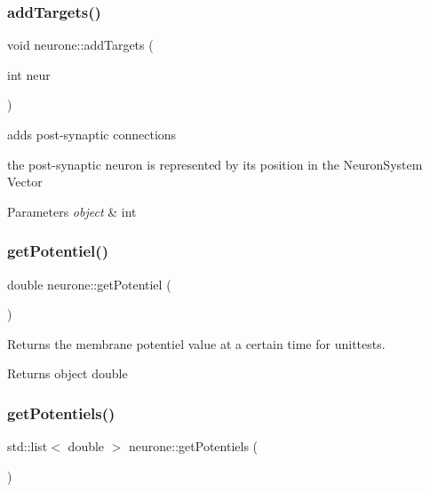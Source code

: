 \subsubsection{\texorpdfstring{add\+Targets()}{addTargets()}}
{\footnotesize\ttfamily void neurone\+::add\+Targets (\begin{DoxyParamCaption}\item[{int}]{neur }\end{DoxyParamCaption})}



add\textquotesingle{}s post-\/synaptic connections 

the post-\/synaptic neuron is represented by its position in the Neuron\+System Vector


\begin{DoxyParams}{Parameters}
{\em object} & int \\
\hline
\end{DoxyParams}
\mbox{\label{classneurone_a938d3de8c8ae1c340e72e4a95c54299b}} 
\subsubsection{\texorpdfstring{get\+Potentiel()}{getPotentiel()}}
{\footnotesize\ttfamily double neurone\+::get\+Potentiel (\begin{DoxyParamCaption}{ }\end{DoxyParamCaption})}



Returns the membrane potentiel value at a certain time for unittests. 

\begin{DoxyReturn}{Returns}
object double 
\end{DoxyReturn}
\mbox{\label{classneurone_a2dc85a6664fb7c1ada0283c23460fe1f}} 
\subsubsection{\texorpdfstring{get\+Potentiels()}{getPotentiels()}}
{\footnotesize\ttfamily std\+::list$<$ double $>$ neurone\+::get\+Potentiels (\begin{DoxyParamCaption}{ }\end{DoxyParamCaption})}



